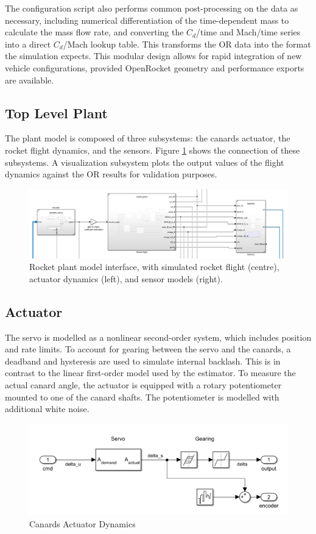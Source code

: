 The configuration script also performs common post-processing on the data as necessary, including numerical differentiation of the time-dependent mass to calculate the mass flow rate, and converting the $C_d$/time and Mach/time series into a direct $C_d$/Mach lookup table. 
This transforms the OR data into the format the simulation expects. 
This modular design allows for rapid integration of new vehicle configurations, provided OpenRocket geometry and performance exports are available.

\subsection{Top Level Plant}
The plant model is composed of three subsystems: the canards actuator, the rocket flight dynamics, and the sensors. Figure \ref{fig:plant-model} shows the connection of these subsystems. 
A visualization subsystem plots the output values of the flight dynamics against the OR results for validation purposes.

\begin{figure}[ht]
    \centering
    \includegraphics[width=0.9\linewidth]{images-plant/sim_interface.png}
    \caption[Rocket plant model interface]{Rocket plant model interface, with simulated rocket flight (centre), actuator dynamics (left), and sensor models (right).}
    \label{fig:plant-model}
\end{figure}

\subsection{Actuator}
The servo is modelled as a nonlinear second-order system, which includes position and rate limits.
To account for gearing between the servo and the canards, a deadband and hysteresis are used to simulate internal backlash. 
This is in contrast to the linear first-order model used by the estimator.  
To measure the actual canard angle, the actuator is equipped with a rotary potentiometer mounted to one of the canard shafts.
The potentiometer is modelled with additional white noise.
\begin{figure}[ht]
    \centering
    \includegraphics[width=0.5\linewidth]{images-plant/actuator.png}
    \caption{Canards Actuator Dynamics}
    \label{fig:actuator-dynamics}
\end{figure}

